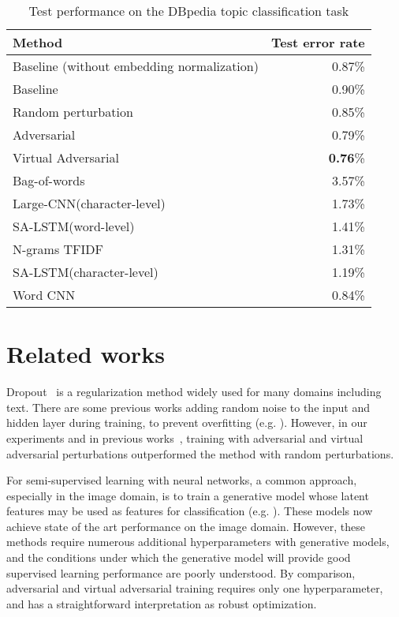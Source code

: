 \documentclass{article}
\begin{document}
\begin{table}[ht]
		\caption{\label{tab:dbpedia_error}Test performance on the DBpedia topic classification task}
                \centering
\begin{tabular}{lr}
			\toprule
			\textbf{Method} & \textbf{Test error rate}\\
			\midrule
			Baseline (without embedding normalization) & 0.87\% \\
			\midrule
			Baseline & 0.90\% \\
			Random perturbation & 0.85\% \\
			Adversarial & 0.79\% \\
			Virtual Adversarial & \textbf{0.76}\% \\
			\midrule
			Bag-of-words\cite[]{zhang2015character} & 3.57\% \\
			Large-CNN(character-level) \cite[]{zhang2015character}& 1.73\% \\
			SA-LSTM(word-level)\cite[]{dai2015semi} & 1.41\% \\
			N-grams TFIDF \cite[]{zhang2015character}& 1.31\% \\
			SA-LSTM(character-level)\cite[]{dai2015semi}& 1.19\% \\
                        Word CNN \cite[]{johnson2016convolutional}& 0.84\% \\
			\bottomrule
		\end{tabular}
\end{table}

\section{Related works}

Dropout~\cite[]{srivastava2014dropout} is a regularization
method widely used for many domains including text.
There are some previous works adding random noise to the input and hidden layer
during training, to prevent overfitting (e.g. \cite[]{SietsmaDow91,Poole14}).
However, in our experiments
and in previous works~\cite[]{miyato2015distributional},
training with adversarial and virtual adversarial perturbations outperformed
the method with random perturbations.  

For semi-supervised learning with neural networks, a common approach, especially in the image domain,
is to train a generative model whose latent features may be used as features for
classification (e.g. \cite[]{Hinton06,maaloe2016auxiliary}).
These models now achieve state of the art performance on the image domain. 
However, these methods require numerous additional hyperparameters with generative
models, and the conditions under which
the generative model will provide good supervised learning performance are
poorly understood.
By comparison, adversarial and virtual adversarial training requires only one hyperparameter,
and has a straightforward interpretation as robust optimization.
\end{document}
